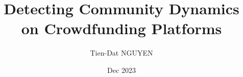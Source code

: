 \title{Detecting Community Dynamics on Crowdfunding Platforms} %
\author{Tien-Dat NGUYEN}
\date{Dec 2023}
\maketitle